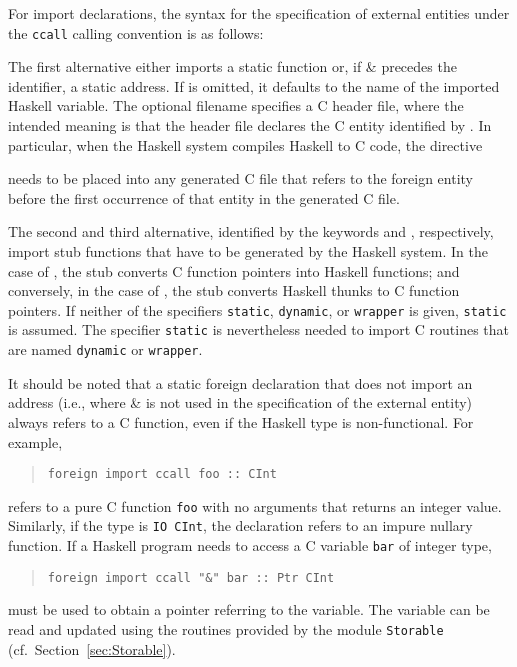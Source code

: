 \documentclass[a4paper,twoside]{article}
\newcommand{\code}[1]{\texttt{#1}}      %
\begin{document}
For import declarations, the syntax for the specification of external entities
under the \code{ccall} calling convention is as follows:
%
\begin{grammar}
\end{grammar}
%
The first alternative either imports a static function  or, if
\gterm\& precedes the identifier, a static address.  If  is
omitted, it defaults to the name of the imported Haskell variable.  The
optional filename  specifies a C header file, where the
intended meaning is that the header file declares the C entity identified by
.  In particular, when the Haskell system compiles Haskell to C
code, the directive
%
\begin{quote}
\end{quote}
%
needs to be placed into any generated C file that refers to the foreign entity
before the first occurrence of that entity in the generated C file.

The second and third alternative, identified by the keywords 
and , respectively, import stub functions that have to be
generated by the Haskell system.  In the case of , the stub
converts C function pointers into Haskell functions; and conversely, in the
case of , the stub converts Haskell thunks to C function
pointers.  If neither of the specifiers \code{static}, \code{dynamic}, or
\code{wrapper} is given, \code{static} is assumed.  The specifier
\code{static} is nevertheless needed to import C routines that are named
\code{dynamic} or \code{wrapper}.

It should be noted that a static foreign declaration that does not import an
address (i.e., where \gterm\& is not used in the specification of the external
entity) always refers to a C function, even if the Haskell type is
non-functional.  For example, 
%
\begin{quote}
\begin{verbatim}
foreign import ccall foo :: CInt
\end{verbatim}
\end{quote}
%
refers to a pure C function \code{foo} with no arguments that returns an
integer value.  Similarly, if the type is \code{IO CInt}, the declaration
refers to an impure nullary function.  If a Haskell program needs to access a
C variable \code{bar} of integer type,
%
\begin{quote}
\begin{verbatim}
foreign import ccall "&" bar :: Ptr CInt
\end{verbatim}
\end{quote}
%
must be used to obtain a pointer referring to the variable.  The variable can
be read and updated using the routines provided by the module \code{Storable}
(cf.\ Section~\ref{sec:Storable}).
\end{document}
